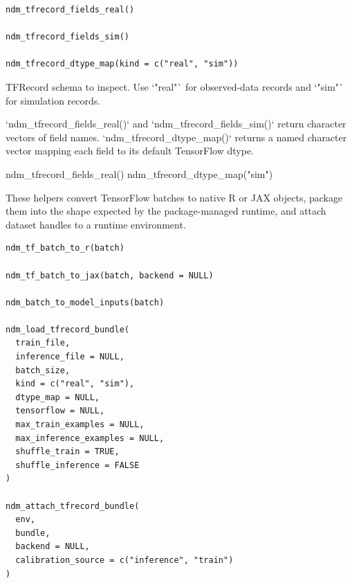 \documentclass[a4paper]{book}
\begin{document}
%
\begin{Usage}
\begin{verbatim}
ndm_tfrecord_fields_real()

ndm_tfrecord_fields_sim()

ndm_tfrecord_dtype_map(kind = c("real", "sim"))
\end{verbatim}
\end{Usage}
%
\begin{Arguments}
\begin{ldescription}
\item[\code{kind}] TFRecord schema to inspect. Use `"real"` for observed-data
records and `"sim"` for simulation records.
\end{ldescription}
\end{Arguments}
%
\begin{Value}
`ndm\_tfrecord\_fields\_real()` and `ndm\_tfrecord\_fields\_sim()` return
character vectors of field names. `ndm\_tfrecord\_dtype\_map()` returns a
named character vector mapping each field to its default TensorFlow dtype.
\end{Value}
%
\begin{Examples}
\begin{ExampleCode}
ndm_tfrecord_fields_real()
ndm_tfrecord_dtype_map("sim")

\end{ExampleCode}
\end{Examples}
%
\begin{Description}
These helpers convert TensorFlow batches to native R or JAX objects, package
them into the shape expected by the package-managed runtime, and attach
dataset handles to a runtime environment.
\end{Description}
%
\begin{Usage}
\begin{verbatim}
ndm_tf_batch_to_r(batch)

ndm_tf_batch_to_jax(batch, backend = NULL)

ndm_batch_to_model_inputs(batch)

ndm_load_tfrecord_bundle(
  train_file,
  inference_file = NULL,
  batch_size,
  kind = c("real", "sim"),
  dtype_map = NULL,
  tensorflow = NULL,
  max_train_examples = NULL,
  max_inference_examples = NULL,
  shuffle_train = TRUE,
  shuffle_inference = FALSE
)

ndm_attach_tfrecord_bundle(
  env,
  bundle,
  backend = NULL,
  calibration_source = c("inference", "train")
)
\end{verbatim}
\end{Usage}
\end{document}

